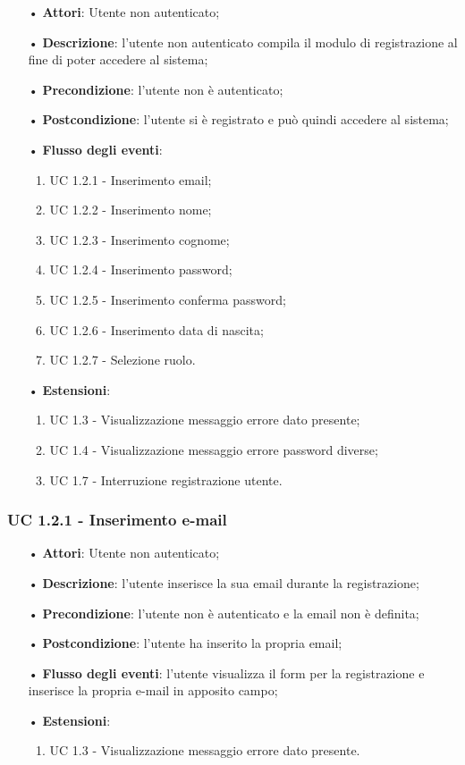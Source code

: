 \begin{itemize}
	\item[•]\textbf{Attori}: Utente non autenticato;
	\item[•]\textbf{Descrizione}: l'utente non autenticato compila il modulo di registrazione al fine di poter accedere al sistema;
	\item[•]\textbf{Precondizione}: l'utente non è autenticato;
	\item[•]\textbf{Postcondizione}: l'utente si è registrato e può quindi accedere al sistema;
	\item[•]\textbf{Flusso degli eventi}:
	\begin{enumerate}
		\item UC 1.2.1 - Inserimento email;
		\item UC 1.2.2 - Inserimento nome;
		\item UC 1.2.3 - Inserimento cognome;
		\item UC 1.2.4 - Inserimento password;
		\item UC 1.2.5 - Inserimento conferma password;
		\item UC 1.2.6 - Inserimento data di nascita;
		\item UC 1.2.7 - Selezione ruolo.
	\end{enumerate}
	\item[•]\textbf{Estensioni}:
	\begin{enumerate}
		\item UC 1.3 - Visualizzazione messaggio errore dato presente;
		\item UC 1.4 - Visualizzazione messaggio errore password diverse;
		\item UC 1.7 - Interruzione registrazione utente.
	\end{enumerate}
\end{itemize}

\subsubsection{UC 1.2.1 - Inserimento e-mail}
\begin{itemize}
	\item[•]\textbf{Attori}: Utente non autenticato;
	\item[•]\textbf{Descrizione}: l'utente inserisce la sua email durante la registrazione;
	\item[•]\textbf{Precondizione}: l'utente non è autenticato e la email non è definita;
	\item[•]\textbf{Postcondizione}: l'utente ha inserito la propria email;
	\item[•]\textbf{Flusso degli eventi}: l'utente visualizza il form per la registrazione e inserisce la propria e-mail in apposito campo;
	\item[•] \textbf{Estensioni}:
		\begin{enumerate}
		\item UC 1.3 - Visualizzazione messaggio errore dato presente.
	\end{enumerate}
\end{itemize}

